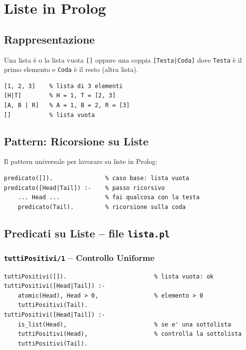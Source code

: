 \documentclass[12pt,a4paper]{article}
\begin{document}
\section{Liste in Prolog}

\subsection{Rappresentazione}

Una lista è o la lista vuota \texttt{[]} oppure una coppia \texttt{[Testa|Coda]}
dove \texttt{Testa} è il primo elemento e \texttt{Coda} è il resto (altra lista).

\begin{lstlisting}
[1, 2, 3]    % lista di 3 elementi
[H|T]        % H = 1, T = [2, 3]
[A, B | R]   % A = 1, B = 2, R = [3]
[]           % lista vuota
\end{lstlisting}

\subsection{Pattern: Ricorsione su Liste}

Il pattern universale per lavorare su liste in Prolog:
\begin{lstlisting}
predicato([]).               % caso base: lista vuota
predicato([Head|Tail]) :-    % passo ricorsivo
    ... Head ...             % fai qualcosa con la testa
    predicato(Tail).         % ricorsione sulla coda
\end{lstlisting}

\subsection{Predicati su Liste -- file \texttt{lista.pl}}

\subsubsection{\texttt{tuttiPositivi/1} -- Controllo Uniforme}
\begin{lstlisting}
tuttiPositivi([]).                         % lista vuota: ok
tuttiPositivi([Head|Tail]) :-
    atomic(Head), Head > 0,                % elemento > 0
    tuttiPositivi(Tail).
tuttiPositivi([Head|Tail]) :-
    is_list(Head),                         % se e' una sottolista
    tuttiPositivi(Head),                   % controlla la sottolista
    tuttiPositivi(Tail).
\end{lstlisting}
\end{document}
